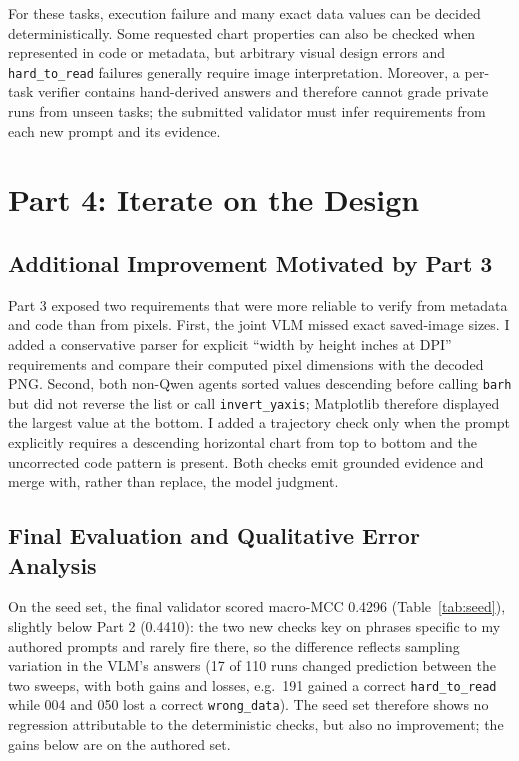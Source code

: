 \documentclass[11pt]{article}
\begin{document}
For these tasks, execution failure and many exact data values can be decided
deterministically. Some requested chart properties can also be checked when
represented in code or metadata, but arbitrary visual design errors and
\texttt{hard\_to\_read} failures generally require image interpretation.
Moreover, a per-task verifier contains hand-derived answers and therefore
cannot grade private runs from unseen tasks; the submitted validator must infer
requirements from each new prompt and its evidence.

\section{Part 4: Iterate on the Design}

\subsection{Additional Improvement Motivated by Part 3}
Part 3 exposed two requirements that were more reliable to verify from metadata
and code than from pixels. First, the joint VLM missed exact saved-image sizes.
I added a conservative parser for explicit ``width by height inches at DPI''
requirements and compare their computed pixel dimensions with the decoded PNG.
Second, both non-Qwen agents sorted values descending before calling
\texttt{barh} but did not reverse the list or call \texttt{invert\_yaxis};
Matplotlib therefore displayed the largest value at the bottom. I added a
trajectory check only when the prompt explicitly requires a descending
horizontal chart from top to bottom and the uncorrected code pattern is present.
Both checks emit grounded evidence and merge with, rather than replace, the
model judgment.

\subsection{Final Evaluation and Qualitative Error Analysis}
On the seed set, the final validator scored macro-MCC 0.4296 (Table~\ref{tab:seed}), slightly below Part 2 (0.4410): the two new checks key on phrases specific to my authored prompts and rarely fire there, so the difference reflects sampling variation in the VLM's answers (17 of 110 runs changed prediction between the two sweeps, with both gains and losses, e.g.\ 191 gained a correct \texttt{hard\_to\_read} while 004 and 050 lost a correct \texttt{wrong\_data}). The seed set therefore shows no regression attributable to the deterministic checks, but also no improvement; the gains below are on the authored set.
\end{document}
